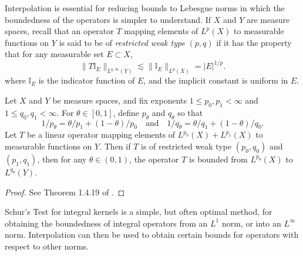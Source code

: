 Interpolation is essential for reducing bounds to Lebesgue norms in which the boundedness of the operators is simpler to understand. If $X$ and $Y$ are measure spaces, recall that an operator $T$ mapping elements of $L^p(X)$ to measurable functions on $Y$ is said to be of \emph{restricted weak type} $(p,q)$ if it has the property that for any measurable set $E \subset X$,
%
\begin{equation}
    \| T \mathbb{I}_E \|_{L^{q,\infty}(Y)} \lesssim \| \mathbb{I}_E \|_{L^p(X)} = |E|^{1/p}.
\end{equation}
%
where $\mathbb{I}_E$ is the indicator function of $E$, and the implicit constant is uniform in $E$.

\begin{theorem} \label{thm:marci}
    Let $X$ and $Y$ be measure spaces, and fix exponents $1 \leq p_0,p_1 < \infty$ and $1 \leq q_0,q_1 < \infty$. For $\theta \in [0,1]$, define $p_\theta$ and $q_\theta$ so that
    \[ 1/p_\theta = \theta/p_1 + (1-\theta)/p_0 \quad\text{and}\quad 1/q_\theta = \theta/q_1 + (1-\theta)/q_0. \]
    Let $T$ be a linear operator mapping elements of $L^{p_0}(X) + L^{p_1}(X)$ to measurable functions on $Y$. Then if $T$ is of restricted weak type $(p_0,q_0)$ and $(p_1,q_1)$, then for any $\theta \in (0,1)$, the operator $T$ is bounded from $L^{p_\theta}(X)$ to $L^{q_\theta}(Y)$.
\end{theorem}
\begin{proof}
    See Theorem 1.4.19 of \cite{Grafakos}.
\end{proof}

Schur's Test for integral kernels is a simple, but often optimal method, for obtaining the boundedness of integral operators from an $L^1$ norm, or into an $L^\infty$ norm. Interpolation can then be used to obtain certain bounds for operators with respect to other norms.

